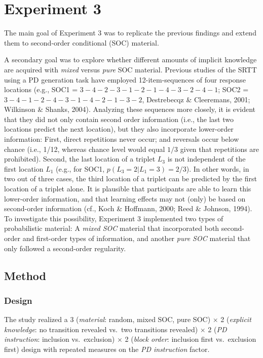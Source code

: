 \documentclass[jou]{apa6}
\theoremstyle{definition}
\theoremstyle{definition}
\theoremstyle{definition}
\theoremstyle{remark}
\begin{document}
\section{Experiment 3}\label{experiment-3}

The main goal of Experiment 3 was to replicate the previous findings and
extend them to second-order conditional (SOC) material.

A secondary goal was to explore whether different amounts of implicit
knowledge are acquired with \emph{mixed} versus \emph{pure} SOC
material. Previous studies of the SRTT using a PD generation task have
employed 12-item-sequences of four response locations (e.g., SOC1 =
\(3{-}4{-}2{-}3{-}1{-}2{-}1{-}4{-}3{-}2{-}4{-}1\); SOC2 =
\(3{-}4{-}1{-}2{-}4{-}3{-}1{-}4{-}2{-}1{-}3{-}2\), Destrebecqz \&
Cleeremans, 2001; Wilkinson \& Shanks, 2004). Analyzing these sequences
more closely, it is evident that they did not only contain second order
information (i.e., the last two locations predict the next location),
but they also incorporate lower-order information: First, direct
repetitions never occur; and reversals occur below chance (i.e., 1/12,
whereas chance level would equal \(1/3\) given that repetitions are
prohibited). Second, the last location of a triplet \(L_3\) is not
independent of the first location \(L_1\) (e.g., for SOC1,
\(p(L_3 = 2 | L_1 = 3) = 2/3\)). In other words, in two out of three
cases, the third location of a triplet can be predicted by the first
location of a triplet alone. It is plausible that participants are able
to learn this lower-order information, and that learning effects may not
(only) be based on second-order information (cf., Koch \& Hoffmann,
2000; Reed \& Johnson, 1994). To investigate this possibility,
Experiment 3 implemented two types of probabilistic material: A
\emph{mixed SOC} material that incorporated both second-order and
first-order types of information, and another \emph{pure SOC} material
that only followed a second-order regularity.

\subsection{Method}\label{method-2}

\subsubsection{Design}\label{design-2}

The study realized a 3 (\emph{material}: random, mixed SOC, pure SOC)
\(\times\) 2 (\emph{explicit knowledge}: no transition revealed vs.~two
transitions revealed) \(\times\) 2 (\emph{PD instruction}: inclusion
vs.~exclusion) \(\times\) 2 (\emph{block order}: inclusion first
vs.~exclusion first) design with repeated measures on the \emph{PD
instruction} factor.
\end{document}
